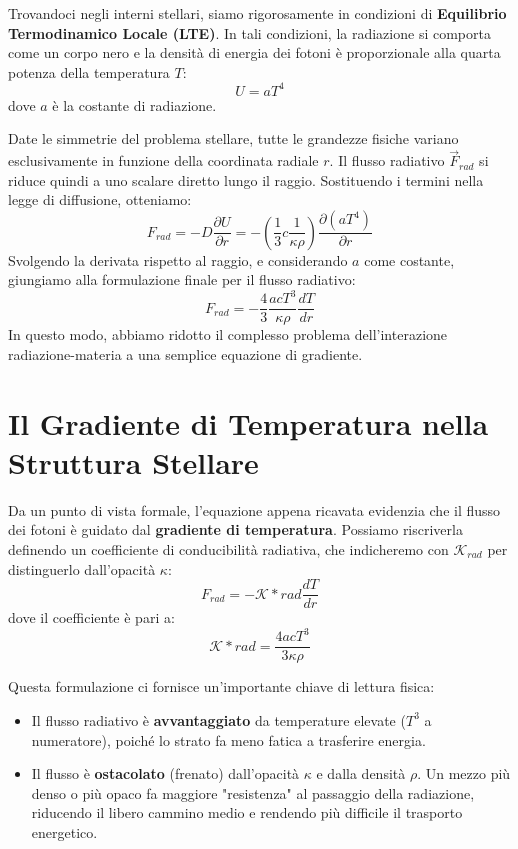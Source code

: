 Trovandoci negli interni stellari, siamo rigorosamente in condizioni di \textbf{Equilibrio Termodinamico Locale (LTE)}. In tali condizioni, la radiazione si comporta come un corpo nero e la densità di energia dei fotoni è proporzionale alla quarta potenza della temperatura $T$:
\begin{equation}
U = a T^4
\end{equation}
dove $a$ è la costante di radiazione.

Date le simmetrie del problema stellare, tutte le grandezze fisiche variano esclusivamente in funzione della coordinata radiale $r$. Il flusso radiativo $\vec{F}_{rad}$ si riduce quindi a uno scalare diretto lungo il raggio.
Sostituendo i termini nella legge di diffusione, otteniamo:
\begin{equation}
F_{rad} = - D \frac{\partial U}{\partial r} = - \left( \frac{1}{3} c \frac{1}{\kappa \rho} \right) \frac{\partial (a T^4)}{\partial r}
\end{equation}
Svolgendo la derivata rispetto al raggio, e considerando $a$ come costante, giungiamo alla formulazione finale per il flusso radiativo:
\begin{equation}
F_{rad} = - \frac{4}{3} \frac{a c T^3}{\kappa \rho} \frac{dT}{dr}
\end{equation}
In questo modo, abbiamo ridotto il complesso problema dell'interazione radiazione-materia a una semplice equazione di gradiente.

\section{Il Gradiente di Temperatura nella Struttura Stellare}

Da un punto di vista formale, l'equazione appena ricavata evidenzia che il flusso dei fotoni è guidato dal \textbf{gradiente di temperatura}. Possiamo riscriverla definendo un coefficiente di conducibilità radiativa, che indicheremo con $\mathcal{K}_{rad}$ per distinguerlo dall'opacità $\kappa$:
\begin{equation}
F_{rad} = - \mathcal{K}*{rad} \frac{dT}{dr}
\end{equation}
dove il coefficiente è pari a:
\begin{equation}
\mathcal{K}*{rad} = \frac{4 a c T^3}{3 \kappa \rho}
\end{equation}

Questa formulazione ci fornisce un'importante chiave di lettura fisica:
\begin{itemize}
\item Il flusso radiativo è \textbf{avvantaggiato} da temperature elevate ($T^3$ a numeratore), poiché lo strato fa meno fatica a trasferire energia.
\item Il flusso è \textbf{ostacolato} (frenato) dall'opacità $\kappa$ e dalla densità $\rho$. Un mezzo più denso o più opaco fa maggiore "resistenza" al passaggio della radiazione, riducendo il libero cammino medio e rendendo più difficile il trasporto energetico.
\end{itemize}

